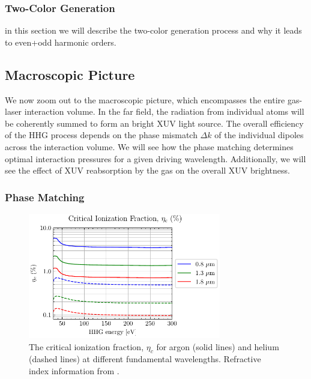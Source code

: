 \subsubsection{Two-Color Generation}
\label{sec:two_color_generation}

in this section we will describe the two-color generation process and why it leads to even+odd harmonic orders.

\subsection{Macroscopic Picture}

We now zoom out to the macroscopic picture, which encompasses the entire gas-laser interaction volume. In the far field, the radiation from individual atoms will be coherently summed to form an bright XUV light source. The overall efficiency of the HHG process depends on the phase mismatch $\Delta k$ of the individual dipoles across the interaction volume. We will see how the phase matching determines optimal interaction pressures for a given driving wavelength. Additionally, we will see the effect of XUV reabsorption by the gas on the overall XUV brightness.

\subsubsection{Phase Matching}

\label{sec:phase-matching}

\begin{figure}
	\centering
	\includegraphics[width=0.75\textwidth]{figures/chap1/crit_ion_frac.pdf}
	\caption{The critical ionization fraction, $\eta_c$ for argon (solid lines) and helium (dashed lines) at different fundamental wavelengths. Refractive index information from \cite{gulliksonCXROXRayInteractions,peckDispersionArgon1964,mansfieldDispersionHelium1969}.}
	\label{fig:crit_ion_frac}
\end{figure}

